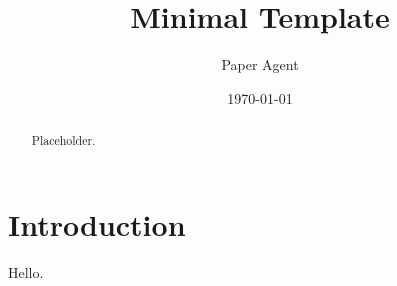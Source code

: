 \documentclass{article}
\title{Minimal Template}
\author{Paper Agent}
\date{\today}
\begin{document}
\maketitle
\begin{abstract}
Placeholder.
\end{abstract}
\section{Introduction}
Hello.
\end{document}
